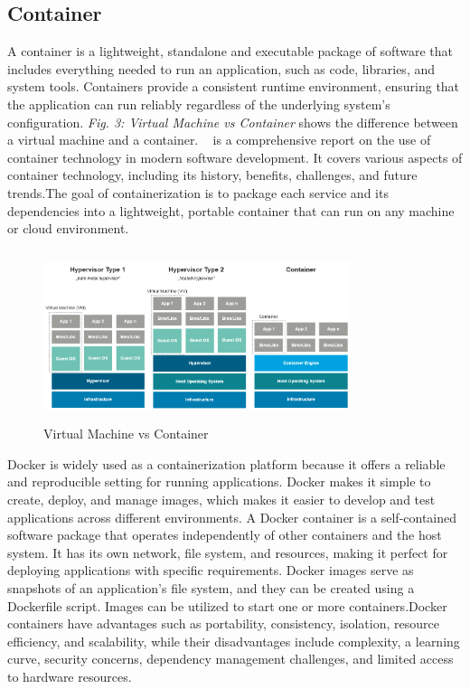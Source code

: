 \subsection{ Container}
A container is a lightweight, standalone and executable package of software that includes everything needed to run an application, such as code, libraries, and system tools. Containers provide a consistent runtime environment, ensuring that the application can run reliably regardless of the underlying system's configuration. \emph{Fig. 3: Virtual Machine vs Container} shows the difference between a virtual machine and a container.
~\cite{siddiq2014comprehen} is a comprehensive report on the use of container technology in modern software development. It covers various aspects of container technology, including its history, benefits, challenges, and future trends.The goal of containerization is to package each service and its dependencies into a lightweight, portable container that can run on any machine or cloud environment. 

\begin{figure}
\centering
\includegraphics[width=9cm, height=5cm]{vitualmachine-vs-dockercontainer}
\caption{Virtual Machine vs Container}
\end{figure}

Docker is widely used as a containerization platform because it offers a reliable and reproducible setting for running applications. Docker makes it simple to create, deploy, and manage images, which makes it easier to develop and test applications across different environments. A Docker container is a self-contained software package that operates independently of other containers and the host system. It has its own network, file system, and resources, making it perfect for deploying applications with specific requirements. Docker images serve as snapshots of an application's file system, and they can be created using a Dockerfile script. Images can be utilized to start one or more containers.Docker containers have advantages such as portability, consistency, isolation, resource efficiency, and scalability, while their disadvantages include complexity, a learning curve, security concerns, dependency management challenges, and limited access to hardware resources.

